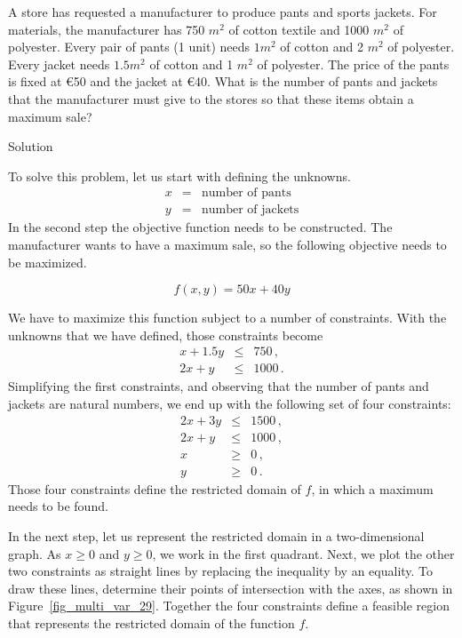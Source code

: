 \begin{example}
\label{LP_ex_1}
A store has requested a manufacturer to produce pants and sports jackets. For materials, the manufacturer has 750 $m^2$ of cotton textile and 1000 $m^2$ of polyester. Every pair of pants (1 unit) needs $1 m^2$ of cotton and 2 $m^2$ of polyester. Every jacket needs $1.5 m^2$ of cotton and 1 $m^2$ of polyester. The price of the pants is fixed at \euro 50 and the jacket at  \euro 40. What is the number of pants and jackets that the manufacturer must give to the stores so that these items obtain a maximum sale?


Solution 


 To solve this problem, let us start with defining the unknowns. 
\begin{eqnarray*}
x &=& \mbox{number of pants} \\
y &=& \mbox{number of jackets}
\end{eqnarray*}
In the second step the objective function needs to be constructed. The manufacturer wants to have a maximum sale, so the following objective needs to be maximized. 

$$f(x,y)= 50x + 40y$$

We have to maximize this function subject to a number of constraints. With the unknowns that we have defined, those constraints become
\begin{eqnarray*}
x + 1.5y &\leq& 750\,, \\
2x + y &\leq& 1000 \,.
\end{eqnarray*}
Simplifying the first constraints, and observing that the number of pants and jackets are natural numbers, we end up with the following set of four constraints: 
\begin{eqnarray*}
 2x+3y &\leq& 1500\,, \\
2x + y &\leq& 1000\,, \\
x &\geq& 0\,, \\
y &\geq& 0 \,.
\end{eqnarray*}
Those four constraints define the restricted domain of $f$, in which a maximum needs to be found. 

In the next step, let us represent the restricted domain in a two-dimensional graph.  As $x \geq 0$ and $y \geq 0$, we work in the first quadrant. Next, we plot the other two constraints as straight lines by replacing the inequality by an equality. To draw these lines, determine their points of intersection with the axes, as shown in Figure~\ref{fig_multi_var_29}. Together the four constraints define a feasible region that represents the restricted domain of the function $f$. 


\end{example}
